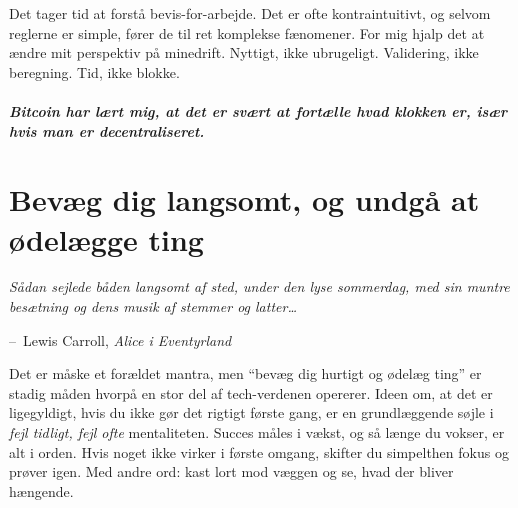 \documentclass[paper=6in:9in,pagesize=pdftex,
               headinclude=on,footinclude=on,12pt]{scrbook}
\makeatletter
\newenvironment{chapquote}[2][4em]{\setlength{\@tempdima}{#1}%
   \def\chapquote@author{#2}%
   \parshape 1 \@tempdima \dimexpr\textwidth-2\@tempdima\relax%
   \itshape}{\par\normalfont\hfill--\ \chapquote@author\hspace*{\@tempdima}\par\bigskip}
\makeatother
\begin{document}
Det tager tid at forstå bevis-for-arbejde. Det er ofte kontraintuitivt, og selvom reglerne er simple, fører de til ret komplekse fænomener. For mig hjalp det at ændre mit perspektiv på minedrift. Nyttigt, ikke ubrugeligt. Validering, ikke beregning. Tid, ikke blokke.\paragraph{Bitcoin har lært mig, at det er svært at fortælle hvad klokken er, især hvis man er decentraliseret.}%
%
%
%
%
%
%
%

\chapter{Bevæg dig langsomt, og undgå at ødelægge ting}
\label{les:18}

\begin{chapquote}{Lewis Carroll, \textit{Alice i Eventyrland}} Sådan sejlede båden langsomt af sted, under den lyse sommerdag, med sin muntre besætning og dens musik af stemmer og latter\ldots
\end{chapquote}

Det er måske et forældet mantra, men \enquote{bevæg dig hurtigt og ødelæg ting} er stadig måden hvorpå en stor del af tech-verdenen opererer. Ideen om, at det er ligegyldigt, hvis du ikke gør det rigtigt første gang, er en grundlæggende søjle i \textit{fejl tidligt, fejl ofte} mentaliteten. Succes måles i vækst, og så længe du vokser, er alt i orden. Hvis noget ikke virker i første omgang, skifter du simpelthen fokus og prøver igen. Med andre ord: kast lort mod væggen og se, hvad der bliver hængende.
\end{document}
